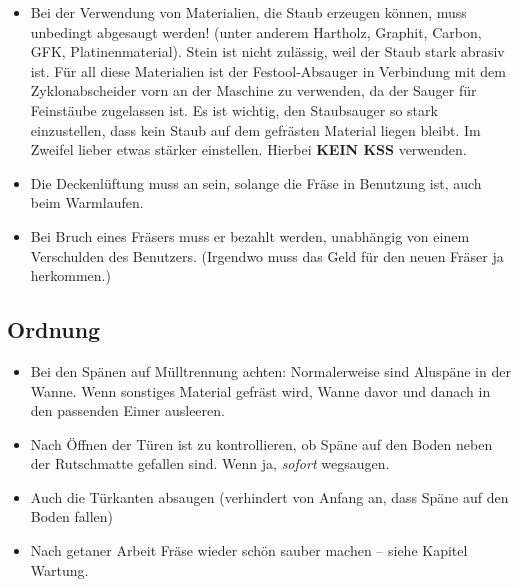 \documentclass{\basedir/fablab-document}
\begin{document}
\begin{itemize}
\begin{itemize}
	\item Während jemand an der offenen Fräse ist, bedient kein anderer den PC. Zum manuellen Verfahren beim Antasten die Tastatur mitnehmen und es selber machen!
	\item Spindel und Nebelkühlung auslassen, solange die Maschine offen ist!
	\item Ausnahme Kühlung: Beim Justieren der Kühlmittelstrahlen auf den Fräser darf die Kühlung natürlich an sein.
\end{itemize}
	\item Bei der Verwendung von Materialien, die Staub erzeugen können, muss unbedingt abgesaugt werden! (unter anderem Hartholz, Graphit, Carbon, GFK, Platinenmaterial). Stein ist nicht zulässig, weil der Staub stark abrasiv ist. Für all diese Materialien ist der Festool-Absauger in Verbindung mit dem Zyklonabscheider vorn an der Maschine zu verwenden, da der Sauger für Feinstäube zugelassen ist. Es ist wichtig, den Staubsauger so stark einzustellen, dass kein Staub auf dem gefrästen Material liegen bleibt. Im Zweifel lieber etwas stärker einstellen. Hierbei \textbf{KEIN KSS} verwenden.
	\item Die Deckenlüftung muss an sein, solange die Fräse in Benutzung ist, auch beim Warmlaufen.
	\item Bei Bruch eines Fräsers muss er bezahlt werden, unabhängig von einem Verschulden des Benutzers. (Irgendwo muss das Geld für den neuen Fräser ja herkommen.)
\end{itemize}
\subsection{Ordnung} \label{ordnung}
\begin{itemize}
	\item Bei den Spänen auf Mülltrennung achten: Normalerweise sind Aluspäne in der Wanne. Wenn sonstiges Material gefräst wird, Wanne davor und danach in den passenden Eimer ausleeren.
	\item Nach Öffnen der Türen ist zu kontrollieren, ob Späne auf den Boden neben der Rutschmatte gefallen sind. Wenn ja, \emph{sofort} wegsaugen.
	\item Auch die Türkanten absaugen (verhindert von Anfang an, dass Späne auf den Boden fallen)
	\item Nach getaner Arbeit Fräse wieder schön sauber machen -- siehe Kapitel Wartung.
\end{itemize}

\clearpage
\renewcommand{\contentsname}{Inhaltsverzeichnis / Arbeitsablauf}
\setcounter{tocdepth}{2}
\tableofcontents
\newpage
\end{document}
